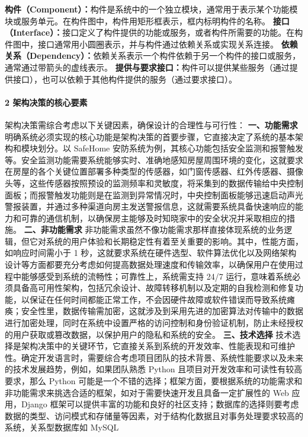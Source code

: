 \textbf{构件（Component）：}构件是系统中的一个独立模块，通常用于表示某个功能模块或服务单元。在构件图中，构件用矩形框表示，框内标明构件的名称。
\textbf{接口（Interface）：}接口定义了构件提供的功能或服务，或者构件所需要的功能。在构件图中，接口通常用小圆圈表示，并与构件通过依赖关系或实现关系连接。
\textbf{依赖关系（Dependency）：}依赖关系表示一个构件依赖于另一个构件的接口或服务，通常通过带箭头的虚线表示。
\textbf{提供与要求接口：}构件可以提供某些服务（通过提供接口），也可以依赖于其他构件提供的服务（通过要求接口）。 \paragraph{2
架构决策的核心要素}\label{ux67b6ux6784ux51b3ux7b56ux7684ux6838ux5fc3ux8981ux7d20} 架构决策需综合考虑以下关键因素，确保设计的合理性与可行性： \textbf{一、功能需求}
明确系统必须实现的核心功能是架构决策的首要步骤，它直接决定了系统的基本架构和模块划分。以 SafeHome
安防系统为例，其核心功能包括安全监测和报警触发等。安全监测功能需要系统能够实时、准确地感知房屋周围环境的变化，这就要求在房屋的各个关键位置部署多种类型的传感器，如门窗传感器、红外传感器、摄像头等，这些传感器按照预设的监测频率和灵敏度，将采集到的数据传输给中央控制面板；而报警触发功能则是在监测到异常情况时，中央控制面板能够迅速启动声光警报装置，并通过多种渠道向房主发送警报信息，这就需要系统具备快速响应的能力和可靠的通信机制，以确保房主能够及时知晓家中的安全状况并采取相应的措施。
\textbf{二、非功能需求} 非功能需求虽然不像功能需求那样直接体现系统的业务逻辑，但它对系统的用户体验和长期稳定性有着至关重要的影响。其中，性能方面，如响应时间需小于 1
秒，这就要求系统在硬件选型、软件算法优化以及网络架构设计等方面都要充分考虑如何提高数据处理速度和传输效率，以确保用户在使用过程中能够感受到系统的流畅性；可靠性上，系统需支持 24/7
运行，意味着系统必须具备高可用性架构，包括冗余设计、故障转移机制以及定期的自我检测和修复功能，以保证在任何时间都能正常工作，不会因硬件故障或软件错误而导致系统瘫痪；安全性里，数据传输需加密，这就涉及到采用先进的加密算法对传输中的数据进行加密处理，同时在系统中设置严格的访问控制和身份验证机制，防止未经授权的用户获取或篡改数据，以保护用户的隐私和系统的安全。
\textbf{三、技术选择} 技术选择是架构决策中的关键环节，它直接关系到系统的开发效率、性能表现和可维护性。确定开发语言时，需要综合考虑项目团队的技术背景、系统性能要求以及未来的技术发展趋势，例如，如果团队熟悉 Python
且项目对开发效率和可读性有较高要求，那么 Python 可能是一个不错的选择；框架方面，要根据系统的功能需求和非功能需求来挑选合适的框架，如对于需要快速开发且具备一定扩展性的 Web 应用，Django
框架可以提供丰富的功能和良好的社区支持；数据库的选择则要考虑数据的类型、访问模式和存储量等因素，对于结构化数据且对事务处理要求较高的系统，关系型数据库如 MySQL
